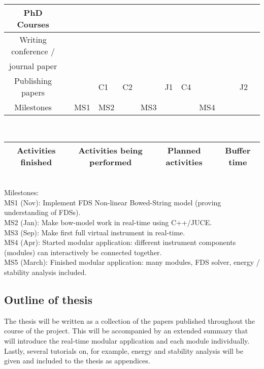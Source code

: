 \begin{tabular}{|c|p{\tabcolwidth}|p{\tabcolwidth}|p{\tabcolwidth}|p{\tabcolwidth}|p{\tabcolwidth}|p{\tabcolwidth}|p{\tabcolwidth}|p{\tabcolwidth}|p{\tabcolwidth}|p{\tabcolwidth}|p{\tabcolwidth}|p{\tabcolwidth}|}
     \hline PhD Courses & \cellcolor{green} & \cellcolor{green} & &  \cellcolor{green} & \cellcolor{lighterred} & \cellcolor{lighterred}& & & & & & \cellcolor{lighterblue}
     \\
     \hline 
      Writing conference /  & & \cellcolor{green} &\cellcolor{green}  & \cellcolor{green} & \cellcolor{lighterred} & & & & & & &
      \cellcolor{lighterblue}\\
     journal paper & & \cellcolor{green} & \cellcolor{green} & \cellcolor{green} &\cellcolor{lighterred} & & & & & & &
      \cellcolor{lighterblue}\\
     \hline 
     Publishing papers & & & \cellcolor{green}\centering C1 & \cellcolor{green}\centering C2 & & \cellcolor{lighterred} \centering J1 &\cellcolor{lighterred}\centering C4& & & & \cellcolor{lighterred} \centering J2 &  \cellcolor{lighterblue}
     \\
     \hline
     Milestones& & \centering MS1 \cellcolor{green} &\centering MS2 \cellcolor{green} & & MS3 \cellcolor{yellow} & & & \centering MS4 \cellcolor{lighterred} & & & & \cellcolor{lighterblue}
     \\
     \hline
\end{tabular}
\vspace{0.3cm}
\\
\begin{tabular}[h]{|c|c|c|c|}
\hline
\cellcolor{green} Activities finished & \cellcolor{yellow} Activities being performed & \cellcolor{lighterred} Planned activities & \cellcolor{lighterblue} Buffer time\\
\hline
\end{tabular}
\vspace{0.3cm}
\\
\normalsize
Milestones:
\\
MS1 (Nov): Implement FDS Non-linear Bowed-String model (proving understanding of FDSs).\\
MS2 (Jan): Make bow-model work in real-time using C++/JUCE.\\
MS3 (Sep): Make first full virtual instrument in real-time.\\
MS4 (Apr): Started modular application: different instrument components (modules) can interactively be connected together.\\
MS5 (March): Finished modular application: many modules, FDS solver, energy / stability analysis included. 

\subsection{Outline of thesis}
The thesis will be written as a collection of the papers published throughout the course of the project. This will be accompanied by an extended summary that will introduce the real-time modular application and each module individually. Lastly, several tutorials on, for example, energy and stability analysis will be given and included to the thesis as appendices. 

